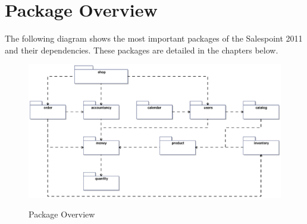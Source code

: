 \section{Package Overview}
The following diagram shows the most important packages of the Salespoint 2011 and their dependencies. These packages are detailed in the chapters below.

\begin{figure}[ht]
	\centering
  \includegraphics[scale =.72]{images/Overview_Package.eps}
	\label{package_overview}
	\caption{Package Overview}
\end{figure}